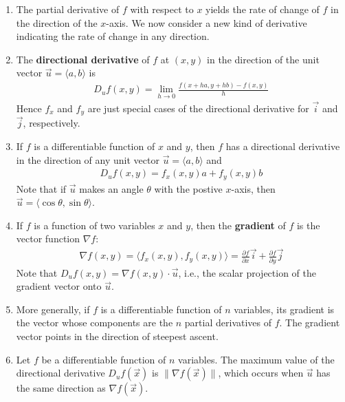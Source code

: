 \documentclass[10pt]{article}
\begin{document}
\begin{multicols*}{2}
\begin{enumerate}
    \begin{enumerate}
        \item The partial derivative of $f$ with respect to $x$ yields the rate of change of $f$ in the direction of the $x$-axis. We now consider a new kind of derivative indicating the rate of change in any direction.
        \item The \textbf{directional derivative} of $f$ at $(x, y)$ in the direction of the unit vector $\vec{u} = \langle a,b \rangle$ is
        \begin{align*}
            D_u f(x,y) = \lim_{h \rightarrow 0} \frac{f(x+ha, y+hb) - f(x,y)}{h}
        \end{align*}
        Hence $f_x$ and $f_y$ are just special cases of the directional derivative for $\vec{i}$ and $\vec{j}$, respectively.
        \item If $f$ is a differentiable function of $x$ and $y$, then $f$ has a directional derivative in the direction of any unit vector $\vec{u} = \langle a,b \rangle$ and 
        \begin{align*}
            D_u f(x,y) = f_x(x,y)a + f_y(x,y)b
        \end{align*}
        Note that if $\vec{u}$ makes an angle $\theta$ with the postive $x$-axis, then $\vec{u} =\langle \cos{\theta}, \sin{\theta} \rangle$.
        \item If $f$ is a function of two variables $x$ and $y$, then the \textbf{gradient} of $f$ is the vector function $\nabla f$:
        \begin{align*}
            \nabla f(x,y) = \langle f_x(x,y), f_y(x,y) \rangle = \frac{\partial f}{\partial x} \vec{i} + \frac{\partial f}{\partial y} \vec{j}
        \end{align*}
        Note that $D_u f(x,y) = \nabla f(x,y) \cdot \vec{u}$, i.e., the scalar projection of the gradient vector onto $\vec{u}$.
        \item More generally, if $f$ is a differentiable function of $n$ variables, its gradient is the vector whose components are the $n$ partial derivatives of $f$. The gradient vector points in the direction of steepest ascent.
        \item Let $f$ be a differentiable function of $n$ variables. The maximum value of the directional derivative $D_u f(\vec{x})$ is $\| \nabla f(\vec{x}) \|$, which occurs when $\vec{u}$ has the same direction as $\nabla f(\vec{x})$.

\end{enumerate}
\end{enumerate}
\end{multicols*}
\end{document}
